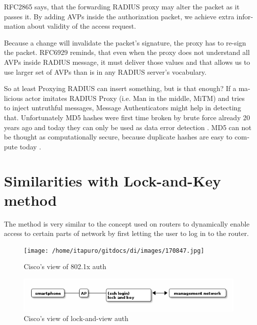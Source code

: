 \documentclass[12pt,a4paper,english]{tutthesis}
\begin{document}
\begin{otherlanguage}{english}
RFC2865 \cite{rfc2865} says, that the forwarding RADIUS proxy may alter the packet
as it passes it.
By adding AVPs inside the authorization packet,  we achieve extra
information about validity of the access request.

Because a change will invalidate the packet's signature, the proxy has to
re-sign the packet.
RFC6929 \cite{rfc6929} reminds, that even when
the proxy does not understand all AVPs inside RADIUS message, it
must deliver those values and that allows us to use larger set of AVPs 
than is in any RADIUS server's vocabulary.


So at least Proxying RADIUS can insert something, but is that enough?
If a malicious actor imitates RADIUS Proxy (i.e. Man in the
middle, MiTM) and tries
to inject untruthful messages, Message Authenticators might help in detecting
that. Unfortunately MD5 hashes were first time broken by brute force
already 20 years ago and today they can only be used as data error
detection \cite[p.2]{rfc6151}. MD5 can not be thought as computationally secure,
because duplicate hashes are easy to compute today  \cite{xie2013fast}. 





\section{Similarities with Lock-and-Key method}
\label{sec-4-8}
The method is very similar to the concept used on routers to dynamically enable
access to certain parts of network by first letting the user to log in
to the router.  


\begin{figure}[htb]
\centering
\texttt{[image: /home/itapuro/gitdocs/di/images/170847.jpg]}
\caption{\label{fig:cisco-802.1x}Cisco's view of 802.1x auth}
\end{figure}






\begin{figure}[htb]
\centering
\includegraphics[width=.9\linewidth]{lockandkey.png}
\caption{\label{eap-sim-testbe}Cisco's view of lock-and-view auth}
\end{figure}





\end{otherlanguage}
\end{document}
